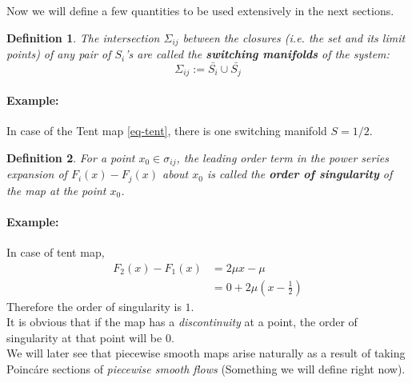 \documentclass{book}
\renewcommand{\(}{\begin{columns}}
\renewcommand{\)}{\end{columns}}
\newcommand{\<}[1]{\begin{column}{#1}}
\renewcommand{\>}{\end{column}}
\newcommand{\bb}[1]{\textbf{#1}}
\newcommand{\para}{\paragraph}
\newtheorem{definition}{Definition}[section]
\begin{document}
Now we will define a few quantities to be used extensively in the next 
sections.  

\begin{definition}
\label{def-switching_manifold}
The intersection $\Sigma_{ij}$ between the closures (i.e. the set and its limit points) of 
any pair of $S_i$'s are called the \bb{switching manifolds} of the system:\[
\Sigma_{ij}:=\bar{S_i}\cup\bar{S_j}
\]
\end{definition}
\para{Example:}
In case of the Tent map \eqref{eq-tent}, there is one switching manifold 
$S={1/2}$.  

\begin{definition}
\label{def-sing_order}
For a point $x_0\in\sigma_{ij}$, the leading order term in the power series 
expansion of $F_i(x)-F_j(x)$ about $x_0$ is called the \bb{order of singularity} of the 
map at the point $x_0$.  
\end{definition}
\para{Example:}
In case of tent map, 
\begin{align}
F_2(x)-F_1(x)&=2\mu x-\mu\\
&=0+2\mu(x-\frac{1}{2})
\end{align}
Therefore the order of singularity is $1$. \\


It is obvious that if the map has a \emph{discontinuity} at a point, the order 
of singularity at that point will be $0$. \\ 


We will later see that piecewise smooth maps arise naturally as a result of 
taking Poincáre sections of \emph{piecewise smooth flows} (Something we will 
define right now).
\end{document}
